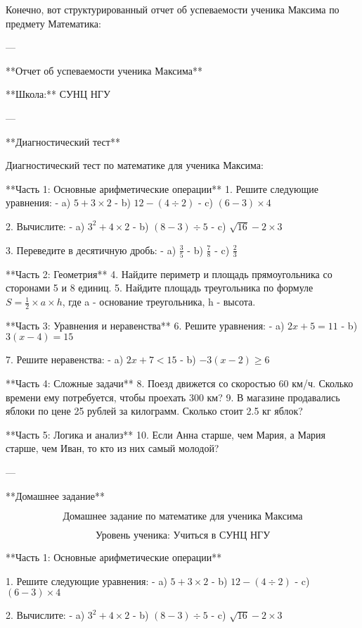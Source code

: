 \documentclass{article}
\begin{document}
Конечно, вот структурированный отчет об успеваемости ученика Максима по предмету Математика:

---

**Отчет об успеваемости ученика Максима**

**Школа:** СУНЦ НГУ

---

**Диагностический тест**

Диагностический тест по математике для ученика Максима:

**Часть 1: Основные арифметические операции**
1. Решите следующие уравнения:
   - a) \(5 + 3 \times 2\)
   - b) \(12 - (4 \div 2)\)
   - c) \((6 - 3) \times 4\)

2. Вычислите:
   - a) \(3^2 + 4 \times 2\)
   - b) \((8 - 3) \div 5\)
   - c) \(\sqrt{16} - 2 \times 3\)

3. Переведите в десятичную дробь:
   - a) \( \frac{3}{5} \)
   - b) \( \frac{7}{8} \)
   - c) \( \frac{2}{3} \)

**Часть 2: Геометрия**
4. Найдите периметр и площадь прямоугольника со сторонами 5 и 8 единиц.
5. Найдите площадь треугольника по формуле \(S = \frac{1}{2} \times a \times h\), где a - основание треугольника, h - высота.

**Часть 3: Уравнения и неравенства**
6. Решите уравнения:
   - a) \(2x + 5 = 11\)
   - b) \(3(x - 4) = 15\)

7. Решите неравенства:
   - a) \(2x + 7 < 15\)
   - b) \(-3(x - 2) \geq 6\)

**Часть 4: Сложные задачи**
8. Поезд движется со скоростью 60 км/ч. Сколько времени ему потребуется, чтобы проехать 300 км?
9. В магазине продавались яблоки по цене 25 рублей за килограмм. Сколько стоит 2.5 кг яблок?

**Часть 5: Логика и анализ**
10. Если Анна старше, чем Мария, а Мария старше, чем Иван, то кто из них самый молодой?

---

**Домашнее задание**

\[
\text{Домашнее задание по математике для ученика Максима}
\]

\[
\text{Уровень ученика: Учиться в СУНЦ НГУ}
\]

**Часть 1: Основные арифметические операции**

1. Решите следующие уравнения:
   - a) \(5 + 3 \times 2\)
   - b) \(12 - (4 \div 2)\)
   - c) \((6 - 3) \times 4\)

2. Вычислите:
   - a) \(3^2 + 4 \times 2\)
   - b) \((8 - 3) \div 5\)
   - c) \(\sqrt{16} - 2 \times 3\)
\end{document}
